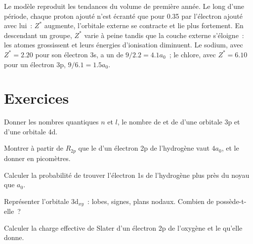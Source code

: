 Le modèle reproduit les tendances du volume de première année. Le long d'une période, chaque
proton ajouté n'est écranté que pour 0.35 par l'électron ajouté avec lui~: $Z^*$ augmente,
l'orbitale externe se contracte et lie plus fortement. En descendant un groupe, $Z^*$ varie à peine
tandis que la couche externe s'éloigne~: les atomes grossissent et leurs énergies d'ionisation
diminuent. Le sodium, avec $Z^* = 2.20$ pour son électron 3s, a un  de
$9/2.2 = 4.1a_0$~; le chlore, avec $Z^* = 6.10$ pour un électron 3p, $9/6.1 = 1.5a_0$.

\section{Exercices}

\begin{exercise}[$\star$]\label{exo:b2:atomic-orbitals:1}
Donner les nombres quantiques $n$ et $l$, le nombre de  et de  d'une orbitale 3p et d'une orbitale 4d.
\end{exercise}

\begin{exercise}[$\star$]\label{exo:b2:atomic-orbitals:2}
Montrer à partir de $R_{2p}$ que le  d'un électron 2p de l'hydrogène vaut
$4a_0$, et le donner en picomètres.
\end{exercise}

\begin{exercise}[$\star$]\label{exo:b2:atomic-orbitals:3}
Calculer la probabilité de trouver l'électron 1s de l'hydrogène plus près du
noyau que $a_0$.
\end{exercise}

\begin{exercise}[$\star$]\label{exo:b2:atomic-orbitals:4}
Représenter l'orbitale $3\mathrm d_{xy}$~: lobes, signes, plans nodaux. Combien de 
possède-t-elle~?
\end{exercise}

\begin{exercise}[$\star\star$]\label{exo:b2:atomic-orbitals:5}
Calculer la charge effective de Slater d'un électron 2p de l'oxygène et le  qu'elle donne.
\end{exercise}

